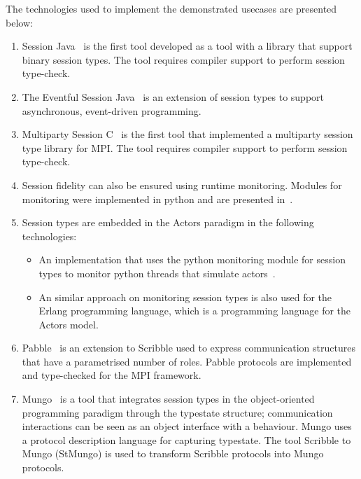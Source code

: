The technologies used to implement the demonstrated usecases are presented
below:
%
\begin{enumerate}
	\item	Session Java~\cite{HU07TYPE-SAFE} is the first tool
			developed as a tool with a library that support binary session
			types. The tool requires compiler support to perform session
			type-check.

	\item	The Eventful Session Java~\cite{event} is an extension
			of session types to support asynchronous, event-driven programming.

	\item	Multiparty Session C~\cite{NYH12}
			is the first tool that implemented a
			multiparty session type library for MPI.
			The tool requires compiler support to perform session
			type-check.


	\item	Session fidelity can also be ensured using runtime monitoring.
			Modules for monitoring were implemented in python and are presented in~\cite{DBLP:conf/rv/NeykovaYH13}.

	\item	Session types are embedded in the Actors paradigm in the following technologies:
			\begin{itemize}
				\item	An implementation that uses the python monitoring module for session types to
						monitor python threads that simulate actors~\cite{DBLP:conf/coordination/NeykovaY14}.
				\item	An similar approach on monitoring session types is also used for the
						Erlang programming language, which is a programming language for the Actors model.
			\end{itemize}

	\item	Pabble~\cite{DBLP:conf/pdp/NgY14} is an extension to Scribble used to express
			communication structures that have a parametrised number of roles.
			Pabble protocols are implemented and type-checked for the MPI framework.

	\item	Mungo~\cite{mungo} is a tool that integrates session types in the object-oriented
			programming paradigm through the typestate structure; communication
			interactions can be seen as an object interface with a behaviour.
			Mungo uses a protocol description language for capturing typestate.
			The tool Scribble to Mungo (StMungo) is used to transform Scribble
			protocols into Mungo protocols.



\end{enumerate}
